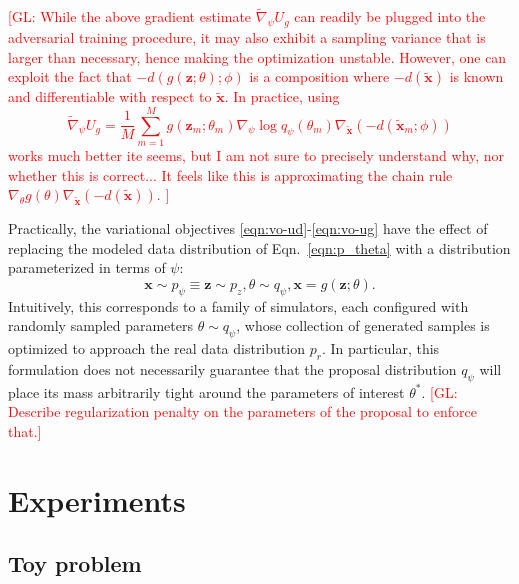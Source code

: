 \documentclass[twocolumn,superscriptaddress,aps]{revtex4-1}
\newcommand{\glnote}[1]{\textcolor{red}{[GL: #1]}}
\theoremstyle{plain}
\begin{document}
\glnote{
While the above gradient estimate $\tilde{\nabla}_\psi U_g$ can readily be plugged
into the adversarial training procedure, it may also exhibit a sampling
variance that is larger than necessary, hence making the optimization unstable.
However, one can exploit the fact that $-d(g(\mathbf{z}; \theta); \phi)$
is a composition where $-d(\tilde{\mathbf{x}})$ is
known and differentiable with respect to $\tilde{\mathbf{x}}$.
In practice, using
\begin{equation}
    \tilde{\nabla}_\psi U_g = \frac{1}{M} \sum_{m=1}^M g(\mathbf{z}_m; \theta_m) \nabla_\psi \log q_\psi(\theta_m) \nabla_{\tilde{\mathbf{x}}} (-d(\tilde{\mathbf{x}}_m; \phi))
\end{equation}
works much better ite seems, but I am not sure to precisely understand why, nor whether this is correct...
It feels like this is approximating the chain rule $\nabla_\theta g(\theta)  \nabla_{\tilde{\mathbf{x}}} (-d(\tilde{\mathbf{x}}))$.
}

Practically, the variational objectives \ref{eqn:vo-ud}-\ref{eqn:vo-ug}
have the effect of replacing the modeled data distribution of Eqn.~\ref{eqn:p_theta} with
a distribution parameterized in terms of $\psi$:
\begin{equation}\label{eqn:p_psi}
    \mathbf{x} \sim p_\psi \equiv \mathbf{z} \sim p_z, \theta \sim q_\psi, \mathbf{x} = g(\mathbf{z}; \theta).
\end{equation}
Intuitively, this corresponds to a family of simulators, each configured
with randomly sampled parameters $\theta \sim q_\psi$, whose collection
of generated samples is optimized to approach the real data distribution $p_r$.
In particular, this formulation does not necessarily guarantee that the
proposal distribution $q_\psi$ will place its mass arbitrarily tight
around the parameters of interest $\theta^*$. \glnote{Describe regularization
penalty on the parameters of the proposal to enforce that.}








\section{Experiments}

\subsection{Toy problem}
\end{document}
